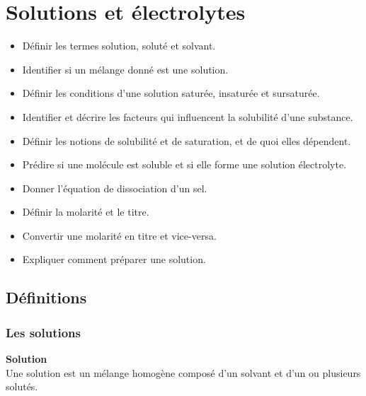 \documentclass[
  11pt,
  a4paper,
  openany]{book}
\providecommand{\tightlist}{%
  \setlength{\itemsep}{0pt}\setlength{\parskip}{0pt}}
\begin{document}
\hypertarget{solutions-et-uxe9lectrolytes}{%
\chapter{Solutions et électrolytes}\label{solutions-et-uxe9lectrolytes}}

\begin{objectives}

\begin{itemize}
\tightlist
\item
  Définir les termes solution, soluté et solvant.
\item
  Identifier si un mélange donné est une solution.
\item
  Définir les conditions d'une solution saturée, insaturée et sursaturée.
\item
  Identifier et décrire les facteurs qui influencent la solubilité d'une substance.
\item
  Définir les notions de solubilité et de saturation, et de quoi elles dépendent.
\item
  Prédire si une molécule est soluble et si elle forme une solution électrolyte.
\item
  Donner l'équation de dissociation d'un sel.
\item
  Définir la molarité et le titre.
\item
  Convertir une molarité en titre et vice-versa.
\item
  Expliquer comment préparer une solution.
\end{itemize}

\end{objectives}

\hypertarget{duxe9finitions}{%
\section{Définitions}\label{duxe9finitions}}

\hypertarget{les-solutions}{%
\subsection{Les solutions}\label{les-solutions}}

\begin{tcolorbox}
\textbf{Solution}\\
Une solution est un mélange homogène composé d'un solvant et d'un ou plusieurs solutés.

\end{tcolorbox}
\end{document}
